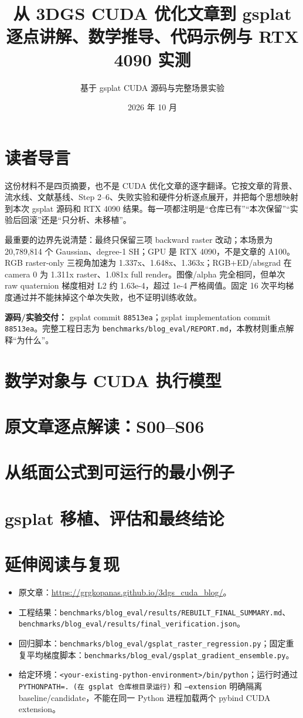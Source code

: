 \documentclass[11pt,a4paper,openany]{book}
\title{从 3DGS CUDA 优化文章到 gsplat\\[0.5em]\large 逐点讲解、数学推导、代码示例与 RTX 4090 实测}
\author{基于 gsplat CUDA 源码与完整场景实验}
\date{2026 年 10 月}
\newcommand{\code}[1]{\texttt{#1}}
\begin{document}
\frontmatter
\maketitle
\chapter*{读者导言}
这份材料不是四页摘要，也不是 CUDA 优化文章的逐字翻译。它按文章的背景、流水线、文献基线、Step 2--6、失败实验和硬件分析逐点展开，并把每个思想映射到本次 gsplat 源码和 RTX 4090 结果。每一项都注明是“仓库已有”“本次保留”“实验后回滚”还是“只分析、未移植”。

最重要的边界先说清楚：最终只保留三项 backward raster 改动；本场景为 20,789,814 个 Gaussian、degree-1 SH；GPU 是 RTX 4090，不是文章的 A100。RGB raster-only 三视角加速为 1.337x、1.648x、1.363x；RGB+ED/absgrad 在 camera 0 为 1.311x raster、1.081x full render。图像/alpha 完全相同，但单次 raw quaternion 梯度相对 L2 约 1.63e-4，超过 1e-4 严格阈值。固定 16 次平均梯度通过并不能抹掉这个单次失败，也不证明训练收敛。

\textbf{源码/实验交付：} gsplat commit \code{88513ea}；gsplat implementation commit \code{88513ea}。完整工程日志为 \code{benchmarks/blog\_eval/REPORT.md}，本教材则重点解释“为什么”。
\tableofcontents
\mainmatter
\chapter{数学对象与 CUDA 执行模型}

\chapter{原文章逐点解读：S00--S06}

\chapter{从纸面公式到可运行的最小例子}

\chapter{gsplat 移植、评估和最终结论}

\backmatter
\chapter*{延伸阅读与复现}
\begin{itemize}
\item 原文章：\url{https://grgkopanas.github.io/3dgs_cuda_blog/}。
\item 工程结果：\code{benchmarks/blog\_eval/results/REBUILT\_FINAL\_SUMMARY.md}、\code{benchmarks/blog\_eval/results/final\_verification.json}。
\item 回归脚本：\code{benchmarks/blog\_eval/gsplat\_raster\_regression.py}；固定重复平均梯度脚本：\code{benchmarks/blog\_eval/gsplat\_gradient\_ensemble.py}。
\item 给定环境：\code{<your-existing-python-environment>/bin/python}；运行时通过 \code{PYTHONPATH=. (在 gsplat 仓库根目录运行)} 和 \code{--extension} 明确隔离 baseline/candidate，不能在同一 Python 进程加载两个 pybind CUDA extension。
\end{itemize}
\end{document}
